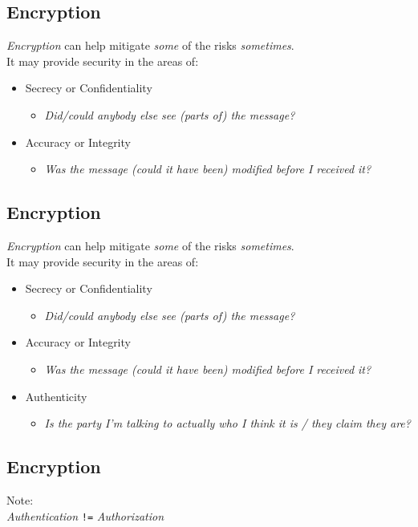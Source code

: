 \documentclass[xga]{xdvislides}
\begin{document}
\subsection{Encryption}
{\em Encryption} can help mitigate {\em some} of the risks {\em sometimes}.
\\

It may provide security in the areas of:
\begin{itemize}
	\item Secrecy or Confidentiality
		\begin{itemize}
			\item {\em Did/could anybody else see (parts of) the message?}
		\end{itemize}
	\item Accuracy or Integrity
		\begin{itemize}
			\item {\em Was the message (could it have been) modified before I received it?}
		\end{itemize}
\end{itemize}

\subsection{Encryption}
{\em Encryption} can help mitigate {\em some} of the risks {\em sometimes}.
\\

It may provide security in the areas of:
\begin{itemize}
	\item Secrecy or Confidentiality
		\begin{itemize}
			\item {\em Did/could anybody else see (parts of) the message?}
		\end{itemize}
	\item Accuracy or Integrity
		\begin{itemize}
			\item {\em Was the message (could it have been) modified before I received it?}
		\end{itemize}
	\item Authenticity
		\begin{itemize}
			\item {\em Is the party I'm talking to actually
who I think it is / they claim they are?}
		\end{itemize}
\end{itemize}

\subsection{Encryption}
\vspace{1in}
\begin{center}
\Huge
Note:\\
\vspace{1in}
{\em Authentication} \verb+!=+ {\em Authorization}
\Normalsize
\end{center}
\end{document}
